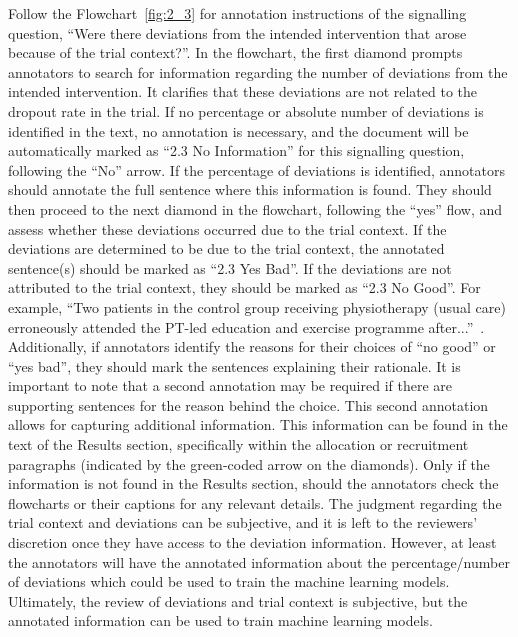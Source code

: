 \documentclass[sn-mathphys,Numbered]{sn-jnl}%
\begin{document}
Follow the Flowchart~\ref{fig:2_3} for annotation instructions of the signalling question, ``Were there deviations from the intended intervention that arose because of the trial context?''.
In the flowchart, the first diamond prompts annotators to search for information regarding the number of deviations from the intended intervention.
It clarifies that these deviations are not related to the dropout rate in the trial.
If no percentage or absolute number of deviations is identified in the text, no annotation is necessary, and the document will be automatically marked as ``2.3 No Information'' for this signalling question, following the  ``No'' arrow.
If the percentage of deviations is identified, annotators should annotate the full sentence where this information is found.
They should then proceed to the next diamond in the flowchart, following the ``yes'' flow, and assess whether these deviations occurred due to the trial context.
If the deviations are determined to be due to the trial context, the annotated sentence(s) should be marked as ``2.3 Yes Bad''.
If the deviations are not attributed to the trial context, they should be marked as ``2.3 No Good''.
For example, ``Two patients in the control group receiving physiotherapy (usual care) erroneously attended the PT-led education and exercise programme after...''~\cite{osteraas2019implementing}. %
Additionally, if annotators identify the reasons for their choices of ``no good'' or ``yes bad'', they should mark the sentences explaining their rationale.
It is important to note that a second annotation may be required if there are supporting sentences for the reason behind the choice.
This second annotation allows for capturing additional information.
This information can be found in the text of the Results section, specifically within the allocation or recruitment paragraphs (indicated by the green-coded arrow on the diamonds).
Only if the information is not found in the Results section, should the annotators check the flowcharts or their captions for any relevant details.
The judgment regarding the trial context and deviations can be subjective, and it is left to the reviewers' discretion once they have access to the deviation information.
However, at least the annotators will have the annotated information about the percentage/number of deviations which could be used to train the machine learning models.
Ultimately, the review of deviations and trial context is subjective, but the annotated information can be used to train machine learning models.
%
%
%
\end{document}
